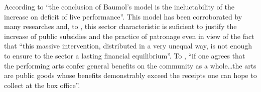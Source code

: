 \documentclass[a4paper, 12pt, openright, oneside, german, french, brazil, english, article]{abntex2}
\begin{document}
	
	According to  ``the conclusion of Baumol's model is the ineluctability of the increase on deficit of live performance''. This model has been corroborated by many researches \cite[e.g.]{throsby1979economics,leroy1980economie,peacock1983inflation,baumol1984inflation,dias2011artes} and, to , this sector characteristic is suficient to justify the increase of public subsidies and the practice of patronage even in view of the fact that ``this massive intervention, distributed in a very unequal way, is not enough to ensure to the sector a lasting financial equilibrium''. To , ``if one agrees that the performing arts confer general benefits on the community as a whole\ldots the arts are public goods whose benefits demonstrably exceed the receipts one can hope to collect at the box office''. 
	
	
	
\end{document}
